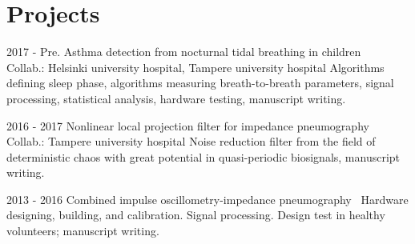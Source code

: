 \documentclass[letterpaper]{twentysecondcv} %
\begin{document}
\section{Projects}
\begin{twenty} %
	\twentyitem
    	{2017 - Pre.}
        {Asthma detection from nocturnal tidal breathing in children~\cite{children,infants}}
        {\\Collab.: Helsinki university hospital, Tampere university hospital }
        {\normalsize Algorithms defining sleep phase, algorithms measuring breath-to-breath parameters, signal processing, statistical analysis, hardware testing, manuscript writing.}
        {}

	\twentyitem
    	{2016 - 2017}
        {Nonlinear local projection filter for impedance pneumography~\cite{nlpf}}
        {\\Collab.: Tampere university hospital }
        {\normalsize Noise reduction filter from the field of deterministic chaos with great potential in quasi-periodic biosignals, manuscript writing.}
        {}  
  
  \twentyitem
    	{2013 - 2016}
        {Combined impulse oscillometry-impedance pneumography~\cite{iosj,multi}}
        {}
        {\normalsize Hardware designing, building, and calibration. Signal processing. Design test in healthy volunteers;  manuscript writing.}
        {     }     
        
\end{twenty} 






\end{document}
